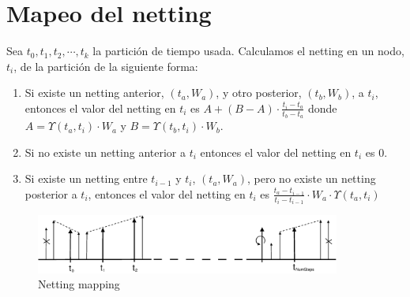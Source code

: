 
\section{Mapeo del netting}

Sea $t_0, t_1, t_2, \cdots, t_k$ la partici\'on de tiempo usada.
Calculamos el netting en un nodo, $t_i$, de la partici\'on de la
siguiente forma:

\begin{enumerate}
\item Si existe un netting anterior, $(t_a,W_a)$, y otro posterior, $(t_b,W_b)$,
a $t_i$, entonces el valor del netting en $t_i$ es
$A + (B-A) \cdot \frac{t_i-t_a}{t_b-t_a}$ donde
$A=\Upsilon(t_a,t_i) \cdot W_a$ y $B=\Upsilon(t_b,t_i) \cdot W_b$.
\item Si no existe un netting anterior a $t_i$ entonces el valor del netting
en $t_i$ es $0$.
\item Si existe un netting entre $t_{i-1}$ y $t_i$, $(t_a,W_a)$, pero no existe un
netting posterior a $t_i$, entonces el valor del netting en $t_i$ es
$\frac{t_a-t_{i-1}}{t_i-t_{i-1}} \cdot W_a \cdot \Upsilon(t_a,t_i)$
\end{enumerate}

\begin{figure}[!hb]
\begin{center}
\includegraphics[width=10cm,angle=0]{./images/nettingmapping.eps}
\caption{Netting mapping}
\label{timetranches}
\end{center}
\end{figure}

